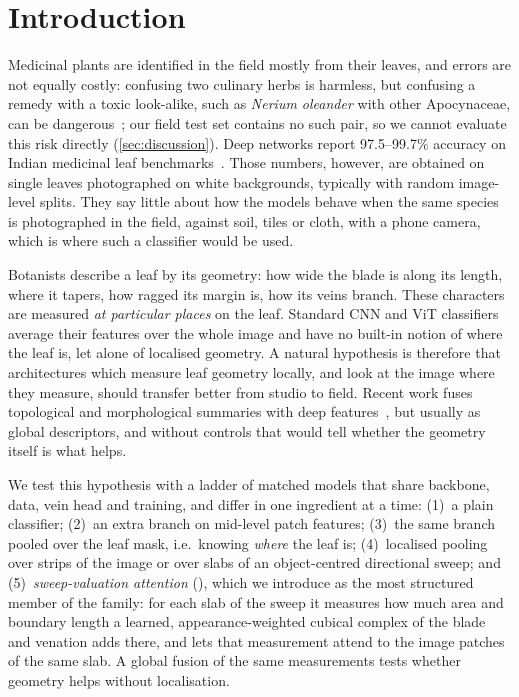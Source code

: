 \section{Introduction}
\label{sec:intro}

Medicinal plants are identified in the field mostly from their leaves, and errors are not equally
costly: confusing two culinary herbs is harmless, but confusing a remedy with a toxic look-alike, such
as \textit{Nerium oleander} with other Apocynaceae, can be dangerous~\citep{farkhondeh2020oleander}; our field test set contains no such pair, so we
cannot evaluate this risk directly (\cref{sec:discussion}).
Deep networks report 97.5--99.7\% accuracy on Indian medicinal leaf
benchmarks~\citep{roopashree2021deepherb,ffncacnn2025}. Those numbers, however, are obtained on
single leaves photographed on white backgrounds, typically with random image-level splits. They say
little about how the models behave when the same species is photographed in the field, against soil,
tiles or cloth, with a phone camera, which is where such a classifier would be used.

Botanists describe a leaf by its geometry: how wide the blade is along its length, where it tapers,
how ragged its margin is, how its veins branch. These characters are measured \emph{at particular
places} on the leaf. Standard CNN and ViT classifiers average their features over the whole image and
have no built-in notion of where the leaf is, let alone of localised geometry. A natural hypothesis is
therefore that architectures which measure leaf geometry locally, and look at the image where they
measure, should transfer better from studio to field. Recent work fuses topological and morphological
summaries with deep features~\citep{phgnet2023,tdavit2026,gu2026multifiltration,blaser2026encoding},
but usually as global descriptors, and without controls that would tell whether the geometry itself
is what helps.

We test this hypothesis with a ladder of matched models that share backbone, data, vein head and
training, and differ in one ingredient at a time: (1)~a plain classifier; (2)~an extra branch on
mid-level patch features; (3)~the same branch pooled over the leaf mask, i.e.\ knowing \emph{where}
the leaf is; (4)~localised pooling over strips of the image or over slabs of an object-centred
directional sweep; and (5)~\emph{sweep-valuation attention} (\SVA{}), which we introduce as the most
structured member of the family: for each slab of the sweep it measures how much area and boundary
length a learned, appearance-weighted cubical complex of the blade and venation adds there, and lets
that measurement attend to the image patches of the same slab. A global fusion of the same measurements
tests whether geometry helps without localisation.

